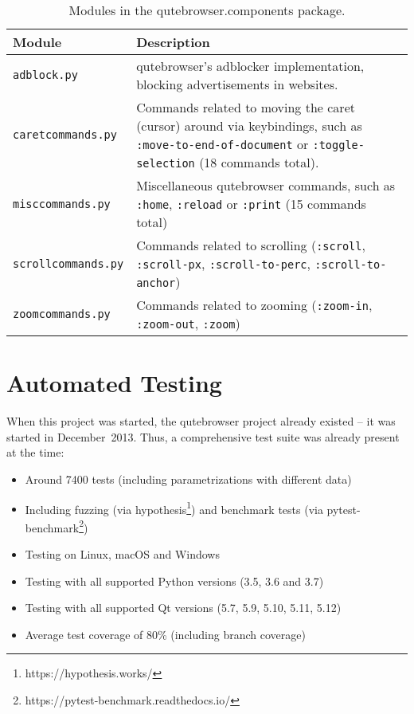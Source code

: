 \begin{table}[H]
  \centering
  \begin{tabulary}{\linewidth}{lL}
    \toprule
    Module & Description \\
    \midrule
    \verb|adblock.py| & qutebrowser's adblocker implementation, blocking
                         advertisements in websites. \\
    \verb|caretcommands.py| & Commands related to moving the caret
                              (cursor) around via keybindings, such as
                              \verb|:move-to-end-of-document| or
                              \verb|:toggle-selection| (18 commands total). \\
    \verb|misccommands.py| & Miscellaneous qutebrowser commands, such as
                             \verb|:home|, \verb|:reload| or \verb|:print| (15
                             commands total) \\
    \verb|scrollcommands.py| & Commands related to scrolling (\verb|:scroll|,
                               \verb|:scroll-px|, \verb|:scroll-to-perc|,
                               \verb|:scroll-to-anchor|) \\
    \verb|zoomcommands.py| & Commands related to zooming (\verb|:zoom-in|,
                             \verb|:zoom-out|, \verb|:zoom|) \\
    \bottomrule
  \end{tabulary}
  \caption{Modules in the qutebrowser.components package.}
\end{table}

\section{Automated Testing}
When this project was started, the qutebrowser project already existed -- it was
started in December~2013. Thus, a comprehensive test suite was already present
at the time:

\begin{itemize}[parsep=5pt]
  \item Around 7400 tests (including parametrizations with different data)
  \item Including fuzzing (via hypothesis\footnote{https://hypothesis.works/})
    and benchmark tests (via pytest-benchmark\footnote{https://pytest-benchmark.readthedocs.io/})
  \item Testing on Linux, macOS and Windows
  \item Testing with all supported Python versions (3.5, 3.6 and 3.7)
  \item Testing with all supported Qt versions (5.7, 5.9, 5.10, 5.11, 5.12)
  \item Average test coverage of 80\% (including branch coverage)
\end{itemize}

